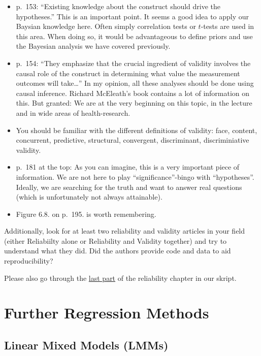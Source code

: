 \documentclass[
]{book}
\providecommand{\tightlist}{%
  \setlength{\itemsep}{0pt}\setlength{\parskip}{0pt}}
\begin{document}
\begin{itemize}
\tightlist
\item
  p.~153: ``Existing knowledge about the construct should drive the hypotheses.''
  This is an important point. It seems a good idea to apply our Baysian knowledge
  here. Often simply correlation tests or \(t\)-tests are used in this area.
  When doing so, it would be advantageous to define priors and use the Bayesian
  analysis we have covered previously.
\item
  p.~154: ``They emphasize that the crucial ingredient of validity involves the
  causal role of the construct in determining what value the measurement
  outcomes will take\ldots{}'' In my opinion, all these analyses should be done using
  causal inference. Richard McEleath's book contains a lot of information on this.
  But granted: We are at the very beginning on this topic, in the lecture and in wide
  areas of health-research.
\item
  You should be familiar with the different definitions of validity:
  face, content, concurrent, predictive, structural, convergent, discriminant,
  discriminiative validity.
\item
  p.~181 at the top: As you can imagine, this is a very important piece of information.
  We are not here to play ``significance''-bingo with ``hypotheses''. Ideally,
  we are searching for the truth and want to answer real questions
  (which is unfortunately not always attainable).
\item
  Figure 6.8. on p.~195. is worth remembering.
\end{itemize}

Additionally, look for at least two reliability and validity articles in your field
(either Reliabiilty alone or Reliability and Validity together) and try to understand what
they did. Did the authors provide code and data to aid reproducibility?

Please also go through the \href{https://jdegenfellner.github.io/Script_QM3_ZHAW/reliability-and-validity.html\#example_RELStudy}{last part}
of the reliability chapter in our skript.

\chapter{Further Regression Methods}\label{further-regression-methods}

\section{Linear Mixed Models (LMMs)}\label{linear-mixed-models-lmms}
\end{document}
